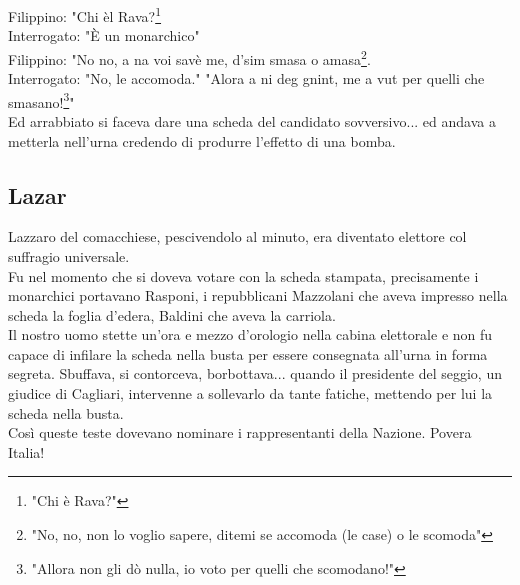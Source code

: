 Filippino: "Chi èl Rava?\footnote{"Chi è Rava?"}\\
Interrogato: "È un monarchico"\\
Filippino: "No no, a na voi savè me, d'sim smasa o amasa\footnote{"No, no, non lo voglio sapere, ditemi se accomoda (le case) o le scomoda"}.\\
Interrogato: "No, le accomoda."
"Alora a ni deg gnint, me a vut per quelli che smasano!\footnote{"Allora non gli dò nulla, io voto per quelli che scomodano!"}"\\
Ed arrabbiato si faceva dare una scheda del candidato sovversivo... ed andava a metterla nell'urna credendo di produrre l'effetto di una bomba.\\
\subsection{Lazar}
Lazzaro del comacchiese, pescivendolo al minuto, era diventato elettore col suffragio universale.\\
Fu nel momento che si doveva votare con la scheda stampata, precisamente i monarchici portavano Rasponi, i repubblicani Mazzolani che aveva impresso nella scheda la foglia d'edera, Baldini che aveva la carriola.\\
Il nostro uomo stette un'ora e mezzo d'orologio nella cabina elettorale e non fu capace di infilare la scheda nella busta per essere consegnata all'urna in forma segreta. Sbuffava, si contorceva, borbottava... quando il presidente del seggio, un giudice di Cagliari, intervenne a sollevarlo da tante fatiche, mettendo per lui la scheda nella busta.\\
Così queste teste dovevano nominare i rappresentanti della Nazione. Povera Italia!